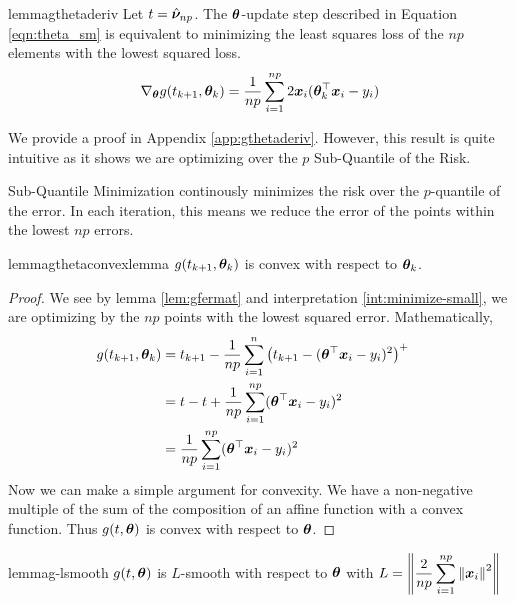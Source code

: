 \documentclass{article} %
\newcommand{\norm}[1]{\left\lVert#1\right\rVert}
\begin{document}
	\begin{restatable}{lemma}{gthetaderiv}\label{lem:gthetaderiv}
		Let $t = \hat{{\bm{\nu}}}_{np}$. The ${\bm{\theta}}$-update step described in Equation \ref{eqn:theta_sm} is equivalent to minimizing the least squares loss of the $np$ elements with the lowest squared loss.
	   \begin{equation}
			\nabla_{{\bm{\theta}}}g(t_{k+1},{\bm{\theta}}_k) = \frac{1}{np}\sum_{i=1}^{np}2{\bm{x}}_i({\bm{\theta}}_k^\top{\bm{x}}_i - y_i)
		\end{equation}
	\end{restatable}
	We provide a proof in Appendix \ref{app:gthetaderiv}. However, this result is quite intuitive as it shows we are optimizing over the $p$ Sub-Quantile of the Risk.
	\begin{interpretation}
		\label{int:minimize-small}
		Sub-Quantile Minimization continously minimizes the risk over the $p$-quantile of the error. In each iteration, this means we reduce the error of the points within the lowest $np$ errors.
	\end{interpretation}

		
	\begin{restatable}{lemma}{gthetaconvexlemma}
		\label{lem:gthetaconvex}
		$g(t_{k+1},{\bm{\theta}}_k)$ is convex with respect to ${\bm{\theta}}_k$.
	\end{restatable}
	\begin{proof}
		We see by lemma \ref{lem:gfermat} and interpretation \ref{int:minimize-small}, we are optimizing by the $np$ points with the lowest squared error. Mathematically, 
		\begin{align*}
			g(t_{k+1},{\bm{\theta}}_k) &= t_{k+1} - \frac{1}{np}\sum_{i=1}^{n}\left(t_{k+1} - ({\bm{\theta}}^\top{\bm{x}}_i - y_i)^2\right)^+ &&\\
			&= t - t + \frac{1}{np}\sum_{i=1}^{np}({\bm{\theta}}^\top{\bm{x}}_i - y_i)^2 &&\\
			&= \frac{1}{np}\sum_{i=1}^{np}({\bm{\theta}}^\top{\bm{x}}_i - y_i)^2 &&
		\end{align*}
		Now we can make a simple argument for convexity. We have a non-negative multiple of the sum of the composition of an affine function with a convex function. Thus $g(t,{\bm{\theta}})$ is convex with respect to ${\bm{\theta}}$.
	\end{proof}
	
	\begin{restatable}{lemma}{g-lsmooth}
		\label{lem:g-lsmooth}
		$g(t,{\bm{\theta}})$ is $L$-smooth with respect to ${\bm{\theta}}$ with $\displaystyle L = \norm{\frac{2}{np}\sum_{i=1}^{np}\norm{\vx_i}^2}$ 
	\end{restatable}
	
\end{document}
